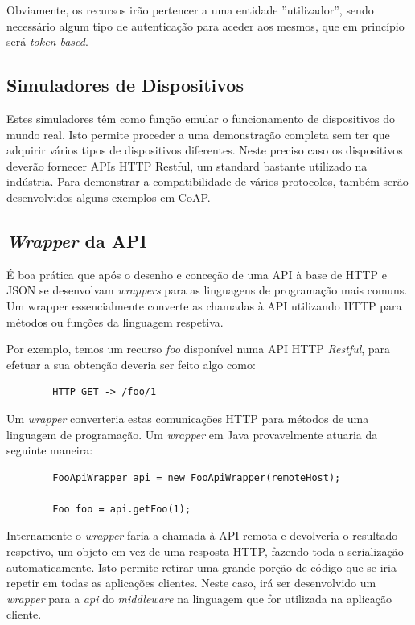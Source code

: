 Obviamente, os recursos irão pertencer a uma entidade ''utilizador'', sendo necessário algum tipo de autenticação para aceder aos mesmos, que em princípio será \textit{token-based}.
\subsection{Simuladores de Dispositivos}

Estes simuladores têm como função emular o funcionamento de dispositivos do mundo real. Isto permite proceder a uma demonstração completa sem ter que adquirir vários tipos de dispositivos diferentes. Neste preciso caso os dispositivos deverão fornecer APIs HTTP Restful, um standard bastante utilizado na indústria. Para demonstrar a compatibilidade de vários protocolos, também serão desenvolvidos alguns exemplos em CoAP.

\subsection{\textit{Wrapper} da API}

É boa prática que após o desenho e conceção de uma API à base de HTTP e JSON se desenvolvam \textit{wrappers} para as linguagens de programação mais comuns. Um wrapper essencialmente converte as chamadas à API utilizando HTTP para métodos ou funções da linguagem respetiva.

Por exemplo, temos um recurso \textit{foo} disponível numa API HTTP \textit{Restful}, para efetuar a sua obtenção deveria ser feito algo como:

\begin{verbatim}
        HTTP GET -> /foo/1
\end{verbatim}

Um \textit{wrapper} converteria estas comunicações HTTP para métodos de uma linguagem de programação. Um \textit{wrapper} em Java provavelmente atuaria da seguinte maneira:

\begin{verbatim}
        FooApiWrapper api = new FooApiWrapper(remoteHost);

        Foo foo = api.getFoo(1);
\end{verbatim}


Internamente o \textit{wrapper} faria a chamada à API remota e devolveria o resultado respetivo, um objeto em vez de uma resposta HTTP, fazendo toda a serialização automaticamente. Isto permite retirar uma grande porção de código que se iria repetir em todas as aplicações clientes. Neste caso, irá ser desenvolvido um \textit{wrapper} para a \textit{api} do \textit{middleware} na linguagem que for utilizada na aplicação cliente.

